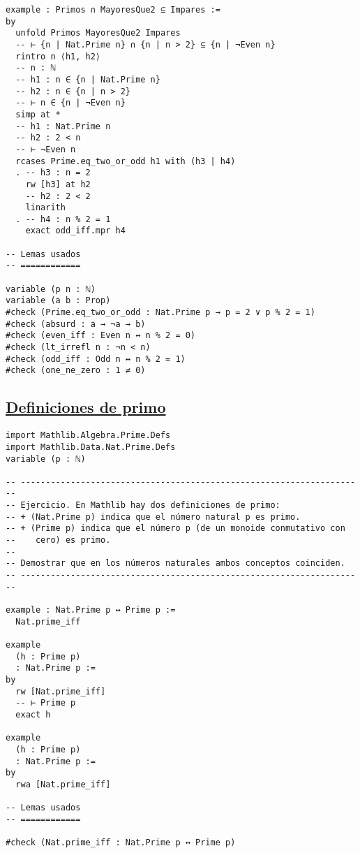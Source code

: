 \begin{verbatim}
example : Primos ∩ MayoresQue2 ⊆ Impares :=
by
  unfold Primos MayoresQue2 Impares
  -- ⊢ {n | Nat.Prime n} ∩ {n | n > 2} ⊆ {n | ¬Even n}
  rintro n ⟨h1, h2⟩
  -- n : ℕ
  -- h1 : n ∈ {n | Nat.Prime n}
  -- h2 : n ∈ {n | n > 2}
  -- ⊢ n ∈ {n | ¬Even n}
  simp at *
  -- h1 : Nat.Prime n
  -- h2 : 2 < n
  -- ⊢ ¬Even n
  rcases Prime.eq_two_or_odd h1 with (h3 | h4)
  . -- h3 : n = 2
    rw [h3] at h2
    -- h2 : 2 < 2
    linarith
  . -- h4 : n % 2 = 1
    exact odd_iff.mpr h4

-- Lemas usados
-- ============

variable (p n : ℕ)
variable (a b : Prop)
#check (Prime.eq_two_or_odd : Nat.Prime p → p = 2 ∨ p % 2 = 1)
#check (absurd : a → ¬a → b)
#check (even_iff : Even n ↔ n % 2 = 0)
#check (lt_irrefl n : ¬n < n)
#check (odd_iff : Odd n ↔ n % 2 = 1)
#check (one_ne_zero : 1 ≠ 0)
\end{verbatim}

\subsection{\href{./src/Conjuntos/Definiciones\_de\_primo.lean}{Definiciones de primo}}
\label{sec:org41696cc}
\begin{verbatim}
import Mathlib.Algebra.Prime.Defs
import Mathlib.Data.Nat.Prime.Defs
variable (p : ℕ)

-- ---------------------------------------------------------------------
-- Ejercicio. En Mathlib hay dos definiciones de primo:
-- + (Nat.Prime p) indica que el número natural p es primo.
-- + (Prime p) indica que el número p (de un monoide conmutativo con
--    cero) es primo.
--
-- Demostrar que en los números naturales ambos conceptos coinciden.
-- ---------------------------------------------------------------------

example : Nat.Prime p ↔ Prime p :=
  Nat.prime_iff

example
  (h : Prime p)
  : Nat.Prime p :=
by
  rw [Nat.prime_iff]
  -- ⊢ Prime p
  exact h

example
  (h : Prime p)
  : Nat.Prime p :=
by
  rwa [Nat.prime_iff]

-- Lemas usados
-- ============

#check (Nat.prime_iff : Nat.Prime p ↔ Prime p)
\end{verbatim}

